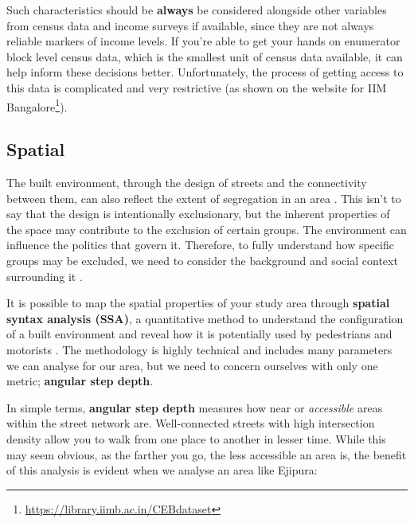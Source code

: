 \documentclass[
]{latex/krantz}
\renewcommand{\href}[2]{#2\footnote{\url{#1}}}
\DeclareRobustCommand{\href}[2]{#2\footnote{\url{#1}}}
\begin{document}
Such characteristics should be \textbf{always} be considered alongside other variables from census data and income surveys if available, since they are not always reliable markers of income levels. If you're able to get your hands on enumerator block level census data, which is the smallest unit of census data available, it can help inform these decisions better. Unfortunately, the process of getting access to this data is complicated and very restrictive (as shown \href{https://library.iimb.ac.in/CEBdataset}{on the website for IIM Bangalore}).

\hypertarget{spatial}{%
\subsection{Spatial}\label{spatial}}

The built environment, through the design of streets and the connectivity between them, can also reflect the extent of segregation in an area \autocite{vlachouSuccessionalSegregationGerani2015}. This isn't to say that the design is intentionally exclusionary, but the inherent properties of the space may contribute to the exclusion of certain groups. The environment can influence the politics that govern it. Therefore, to fully understand how specific groups may be excluded, we need to consider the background and social context surrounding it \autocite{winnerArtifactsHavePolitics1980}.

It is possible to map the spatial properties of your study area through \textbf{spatial syntax analysis (SSA)}, a quantitative method to understand the configuration of a built environment and reveal how it is potentially used by pedestrians and motorists \autocite{dettlaffSpaceSyntaxAnalysis}. The methodology is highly technical and includes many parameters we can analyse for our area, but we need to concern ourselves with only one metric; \textbf{angular step depth}.

In simple terms, \textbf{angular step depth} measures how near or \emph{accessible} areas within the street network are. Well-connected streets with high intersection density allow you to walk from one place to another in lesser time. While this may seem obvious, as the farther you go, the less accessible an area is, the benefit of this analysis is evident when we analyse an area like Ejipura:
\end{document}
